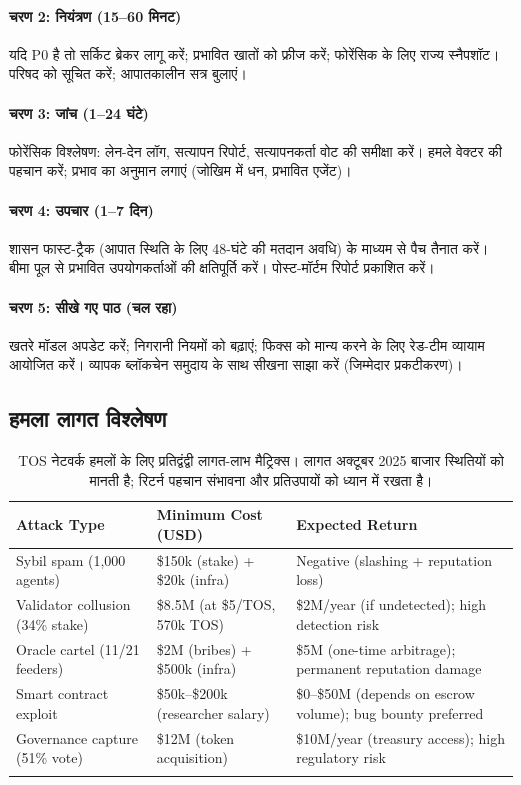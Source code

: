 \documentclass[11pt]{article}
\begin{document}
\begin{itemize}[noitemsep]
\begin{itemize}[noitemsep]
\begin{itemize}[noitemsep]
\begin{itemize}[noitemsep]
\begin{itemize}[noitemsep]
\paragraph{चरण 2: नियंत्रण (15--60 मिनट)}
यदि P0 है तो सर्किट ब्रेकर लागू करें; प्रभावित खातों को फ्रीज करें; फोरेंसिक के लिए राज्य स्नैपशॉट। परिषद को सूचित करें; आपातकालीन सत्र बुलाएं।

\paragraph{चरण 3: जांच (1--24 घंटे)}
फोरेंसिक विश्लेषण: लेन-देन लॉग, सत्यापन रिपोर्ट, सत्यापनकर्ता वोट की समीक्षा करें। हमले वेक्टर की पहचान करें; प्रभाव का अनुमान लगाएं (जोखिम में धन, प्रभावित एजेंट)।

\paragraph{चरण 4: उपचार (1--7 दिन)}
शासन फास्ट-ट्रैक (आपात स्थिति के लिए 48-घंटे की मतदान अवधि) के माध्यम से पैच तैनात करें। बीमा पूल से प्रभावित उपयोगकर्ताओं की क्षतिपूर्ति करें। पोस्ट-मॉर्टम रिपोर्ट प्रकाशित करें।

\paragraph{चरण 5: सीखे गए पाठ (चल रहा)}
खतरे मॉडल अपडेट करें; निगरानी नियमों को बढ़ाएं; फिक्स को मान्य करने के लिए रेड-टीम व्यायाम आयोजित करें। व्यापक ब्लॉकचेन समुदाय के साथ सीखना साझा करें (जिम्मेदार प्रकटीकरण)।

\subsection{हमला लागत विश्लेषण}

\begin{longtable}{@{}p{}p{}p{}@{}}
\toprule
\textbf{Attack Type} & \textbf{Minimum Cost (USD)} & \textbf{Expected Return} \\\midrule
Sybil spam (1,000 agents) & \$150k (stake) + \$20k (infra) & Negative (slashing + reputation loss) \\
Validator collusion (34\% stake) & \$8.5M (at \$5/TOS, 570k TOS) & \$2M/year (if undetected); high detection risk \\
Oracle cartel (11/21 feeders) & \$2M (bribes) + \$500k (infra) & \$5M (one-time arbitrage); permanent reputation damage \\
Smart contract exploit & \$50k--\$200k (researcher salary) & \$0--\$50M (depends on escrow volume); bug bounty preferred \\
Governance capture (51\% vote) & \$12M (token acquisition) & \$10M/year (treasury access); high regulatory risk \\
\bottomrule
\caption{TOS नेटवर्क हमलों के लिए प्रतिद्वंद्वी लागत-लाभ मैट्रिक्स। लागत अक्टूबर 2025 बाजार स्थितियों को मानती है; रिटर्न पहचान संभावना और प्रतिउपायों को ध्यान में रखता है।}
\end{longtable}


\end{itemize}
\end{itemize}
\end{itemize}
\end{itemize}
\end{itemize}
\end{document}
